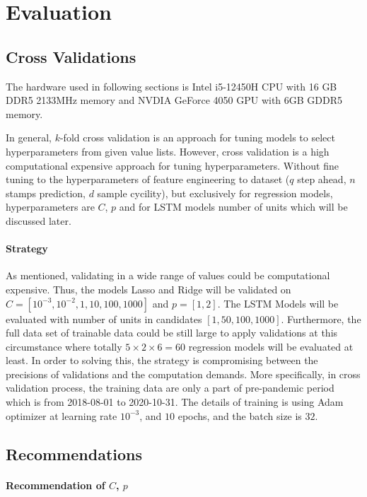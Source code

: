 
\section{Evaluation}

\subsection{Cross Validations}\label{SECTION: CROSS_VALIDATION}
The hardware used in following sections is Intel i5-12450H CPU 
with 16 GB DDR5 2133MHz memory and 
NVDIA GeForce 4050 GPU with 6GB GDDR5 memory.

In general, $k$-fold cross validation is an approach for tuning models to select 
hyperparameters from given value lists. 
However, cross validation is a high computational expensive approach for 
tuning hyperparameters. 
Without fine tuning to the hyperparameters of feature engineering to 
dataset ($q$ step ahead, $n$ stamps prediction, $d$ sample cycility),
but exclusively for regression models, hyperparameters are $C$, $p$ 
and for LSTM models number of units 
which will be discussed later. 
\paragraph{Strategy}
As mentioned, validating in a wide range of values could be computational 
expensive. 
Thus, the models Lasso and Ridge will be validated on 
$C = \left[ 10^{-3}, 10^{-2}, 1, 10,100,1000 \right]$
and $p = \left[ 1, 2\right]$. 
The LSTM Models will be evaluated with 
number of units in candidates $[1, 50, 100, 1000]$. 
Furthermore, the full data set of trainable data could be still large to 
apply validations at this circumstance where 
totally $5\times 2\times 6=60$ regression models will be evaluated at least.
In order to solving this, the strategy is compromising between 
the precisions of validations 
and the computation demands. 
More specifically, in cross validation process, the training data are only 
a part of pre-pandemic period which is from 2018-08-01 to 2020-10-31. 
The details of training is using Adam optimizer at learning rate $10^{-3}$, and 
$10$ epochs, and the batch size is $32$.
\subsection{Recommendations}
\paragraph{Recommendation of $C$, $p$}

